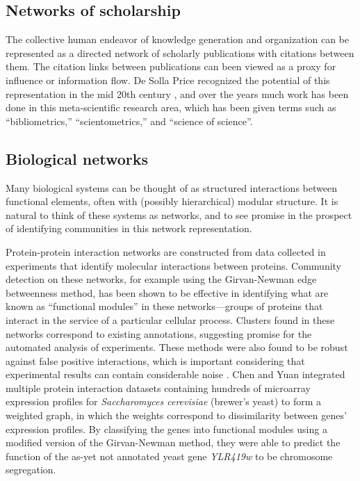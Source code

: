 \hypertarget{networks-of-scholarship}{\subsection{Networks of
scholarship}\label{networks-of-scholarship}}

The collective human endeavor of knowledge generation and organization
can be represented as a directed network of scholarly publications with
citations between them. The citation links between publications can been
viewed as a proxy for influence or information flow. De Solla Price
recognized the potential of this representation in the mid 20th century
\autocite{de_solla_price_networks_1965}, and over the years much work
has been done in this meta-scientific research area, which has been
given terms such as ``bibliometrics,'' ``scientometrics,'' and ``science
of science''.

\hypertarget{biological-networks}{\subsection{Biological
networks}\label{biological-networks}}

Many biological systems can be thought of as structured interactions
between functional elements, often with (possibly hierarchical) modular
structure. It is natural to think of these systems as networks, and to
see promise in the prospect of identifying communities in this network
representation.

Protein-protein interaction networks are constructed from data collected
in experiments that identify molecular interactions between proteins.
Community detection on these networks, for example using the
Girvan-Newman edge betweenness method, has been shown to be effective in
identifying what are known as ``functional modules'' in these
networks---groups of proteins that interact in the service of a
particular cellular process. Clusters found in these networks correspond
to existing annotations, suggesting promise for the automated analysis
of experiments. These methods were also found to be robust against false
positive interactions, which is important considering that experimental
results can contain considerable noise \autocite{dunn_use_2005}. Chen
and Yuan \autocite{chen_detecting_2006} integrated multiple protein
interaction datasets containing hundreds of microarray expression
profiles for \emph{Saccharomyces cerevisiae} (brewer's yeast) to form a
weighted graph, in which the weights correspond to dissimilarity between
genes' expression profiles. By classifying the genes into functional
modules using a modified version of the Girvan-Newman method, they were
able to predict the function of the as-yet not annotated yeast gene
\emph{YLR419w} to be chromosome segregation.

